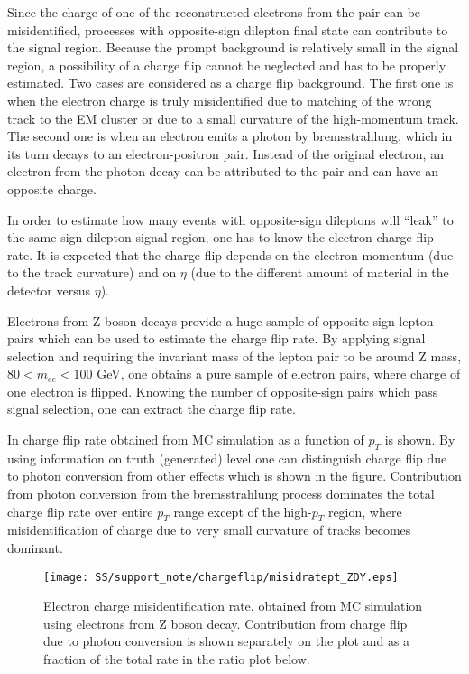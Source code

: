 Since the charge of one of the reconstructed electrons from the pair can be misidentified, 
processes with opposite-sign dilepton final state can contribute to the signal region.
Because the prompt background is relatively small in the signal region, a possibility of a charge flip cannot be neglected and has to be properly estimated. 
Two cases are considered as a charge flip background. 
The first one is when the electron charge is truly misidentified due to matching of the wrong track to the EM cluster 
or due to a small curvature of the high-momentum track. 
The second one is when an electron emits a photon by bremsstrahlung, which in its turn decays to an electron-positron pair. 
Instead of the original electron, an electron from the photon decay can be attributed to the pair and can have an opposite charge.

In order to estimate how many events with opposite-sign dileptons will ``leak'' to the same-sign dilepton signal region, 
one has to know the electron charge flip rate. It is expected that the charge flip depends on the electron momentum (due to the track curvature) 
and on $\eta$ (due to the different amount of material in the detector versus $\eta$).

Electrons from Z boson decays provide a huge sample of opposite-sign lepton pairs which can be used to estimate the charge flip rate. 
By applying signal selection
and requiring the invariant mass of the lepton pair to be around Z mass, $80 < m_{ee} < 100$ GeV, one obtains a pure
sample of electron pairs, where charge of one electron is flipped. Knowing the number of opposite-sign pairs which pass signal selection, 
one can extract the charge flip rate.

In  charge flip rate obtained from MC simulation as a function of $p_T$ is shown.
By using information on truth (generated) level one can distinguish charge flip due to photon conversion from other effects which is shown in the figure.
Contribution from photon conversion from the bremsstrahlung process dominates 
the total charge flip rate over entire $p_T$ range except of the high-$p_T$ region, where misidentification 
of charge due to very small curvature of tracks becomes dominant.

\begin{figure}
\begin{center}
 \texttt{[image: SS/support\_note/chargeflip/misidratept\_ZDY.eps]}
\caption{Electron charge misidentification rate, obtained from MC simulation using electrons from Z boson decay. 
Contribution from charge flip due to photon conversion is shown separately on the plot and as a fraction of the total rate in the ratio plot below.}
\label{fig:chargeFlip_structure}
\end{center}
\end{figure}

